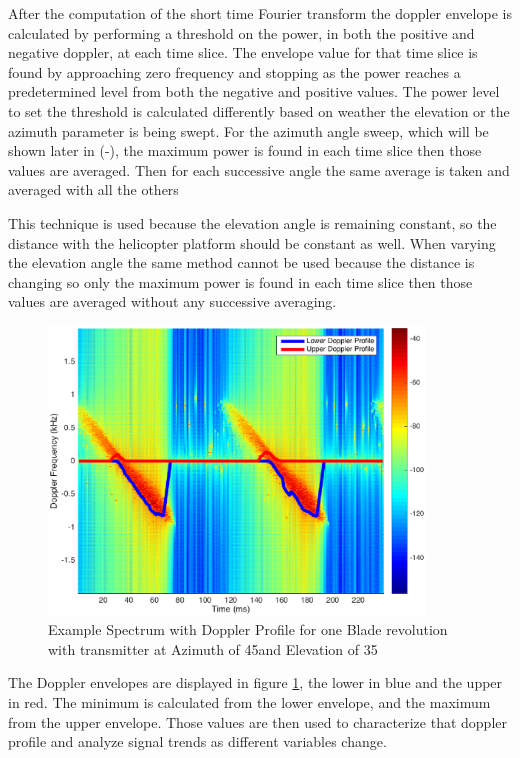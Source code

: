 After the computation of the short time Fourier transform the doppler envelope is calculated by performing a threshold on the power, in both the positive and negative doppler, at each time slice. The envelope value for that time slice is found by approaching zero frequency and stopping as the power reaches a predetermined level from both the negative and positive values. The power level to set the threshold is calculated differently based on weather the elevation or the azimuth parameter is being swept. For the azimuth angle sweep, which will be shown later in (-), the maximum power is found in each time slice then those values are averaged. Then for each successive angle the same average is taken and averaged with all the others 


This technique is used because the elevation angle is remaining constant, so the distance with the helicopter platform should be constant as well. When varying the elevation angle the same method cannot be used because the distance is changing so only the maximum power is found in each time slice then those values are averaged without any successive averaging.

\begin{figure}
	\begin{center}
		\includegraphics[width=10cm]{images/simulation/test_analysis_spectrogram_with_envelope.eps}
		\caption{Example Spectrum with Doppler Profile for one Blade revolution with transmitter at Azimuth of 45\textdegree \space and Elevation of 35\textdegree}
		\label{fig:test_spec_w_doppler_profile}
	\end{center}
\end{figure}

The Doppler envelopes are displayed in figure \ref{fig:test_spec_w_doppler_profile}, the lower in blue and the upper in red. The minimum is calculated from the lower envelope, and the maximum from the upper envelope. Those values are then used to characterize that doppler profile and analyze signal trends as different variables change.

